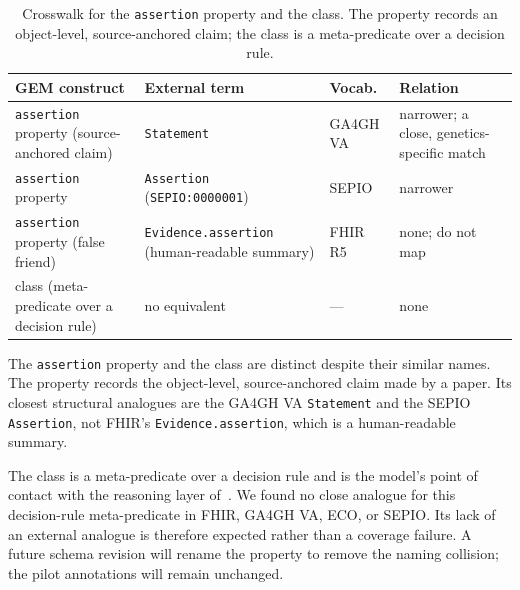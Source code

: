 \begin{table}[H]
  \centering
  \small
  \caption[Crosswalk: assertion property and class]{Crosswalk for the
  \texttt{assertion} property and the \EvidenceAssertion{} class. The
  property records an object-level, source-anchored claim; the class is a
  meta-predicate over a decision rule.}
  \label{tab:xwalk-assertion}
  \begin{tabularx}{\linewidth}{@{}>{\raggedright\arraybackslash}X >{\raggedright\arraybackslash}X l >{\raggedright\arraybackslash}X@{}}
    \toprule
    GEM construct & External term & Vocab. & Relation \\
    \midrule
    \texttt{assertion} property (source-anchored claim) & \texttt{Statement} & GA4GH VA & narrower; a close, genetics-specific match \\
        \texttt{assertion} property & \texttt{Assertion} (\texttt{SEPIO:0000001}) & SEPIO & narrower \\
        \texttt{assertion} property (false friend) & \texttt{Evidence.assertion} (human-readable summary) & FHIR R5 & none; do not map \\
        \EvidenceAssertion{} class (meta-predicate over a decision rule) & no equivalent & --- & none \\
    \bottomrule
  \end{tabularx}
\end{table}

The \texttt{assertion} property and the \EvidenceAssertion{} class are
distinct despite their similar names. The property records the object-level,
source-anchored claim made by a paper. Its closest structural analogues are
the GA4GH VA \texttt{Statement} and the SEPIO \texttt{Assertion}, not
FHIR's \texttt{Evidence.assertion}, which is a human-readable summary.

The \EvidenceAssertion{} class is a meta-predicate over a decision rule and
is the model's point of contact with the reasoning layer
of~\cite{our_preprint}. We found no close analogue for this decision-rule
meta-predicate in FHIR, GA4GH VA, ECO, or SEPIO. Its lack of an external
analogue is therefore expected rather than a coverage failure. A future
schema revision will rename the property to remove the naming collision; the
pilot annotations will remain unchanged.


